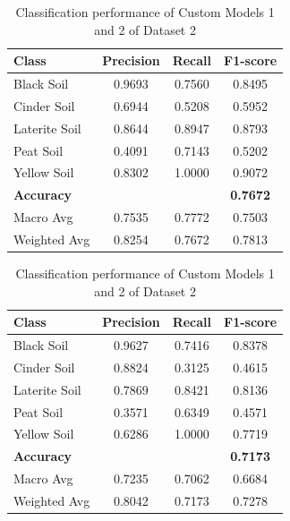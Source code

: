 \documentclass[conference]{IEEEtran}
\begin{document}
\begin{table}[htbp]
    \centering

    \begin{subtable}{\columnwidth}
        \centering
        \begin{tabular}{lccc}
            \toprule
            \textbf{Class} & \textbf{Precision} & \textbf{Recall} & \textbf{F1-score} \\
            \midrule
            Black Soil     & 0.9693 & 0.7560 & 0.8495 \\
            Cinder Soil    & 0.6944 & 0.5208 & 0.5952 \\
            Laterite Soil  & 0.8644 & 0.8947 & 0.8793 \\
            Peat Soil      & 0.4091 & 0.7143 & 0.5202 \\
            Yellow Soil    & 0.8302 & 1.0000 & 0.9072 \\
            \midrule
            \textbf{Accuracy} & & & \textbf{0.7672} \\
            Macro Avg      & 0.7535 & 0.7772 & 0.7503 \\
            Weighted Avg   & 0.8254 & 0.7672 & 0.7813 \\
            \bottomrule
        \end{tabular}
        \caption{Classification Report of Custom Model 1}
        \label{tab:model3}
    \end{subtable}

    \vspace{5pt}

    \begin{subtable}{\columnwidth}
        \centering
        \begin{tabular}{lccc}
            \toprule
            \textbf{Class} & \textbf{Precision} & \textbf{Recall} & \textbf{F1-score} \\
            \midrule
            Black Soil     & 0.9627 & 0.7416 & 0.8378 \\
            Cinder Soil    & 0.8824 & 0.3125 & 0.4615 \\
            Laterite Soil  & 0.7869 & 0.8421 & 0.8136 \\
            Peat Soil      & 0.3571 & 0.6349 & 0.4571 \\
            Yellow Soil    & 0.6286 & 1.0000 & 0.7719 \\
            \midrule
            \textbf{Accuracy} & & & \textbf{0.7173} \\
            Macro Avg      & 0.7235 & 0.7062 & 0.6684 \\
            Weighted Avg   & 0.8042 & 0.7173 & 0.7278 \\
            \bottomrule
        \end{tabular}
        \caption{Classification Report of Custom Model 2}
        \label{tab:model4}
    \end{subtable}

    \caption{Classification performance of Custom Models 1 and 2 of Dataset 2}
    \label{tab:additional_models}
\end{table}
\end{document}
